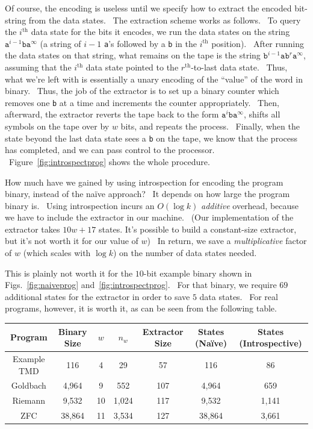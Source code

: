 \documentclass[11pt]{article}
\begin{document}
Of course, the encoding is useless until we specify how to extract the encoded bit-string from the data states. \ The extraction scheme works as follows. \ To query the $i^\textrm{th}$ data state for the bits it encodes, we run the data states on the string $\texttt{a}^{i-1}\texttt{b}\texttt{a}^{\infty}$ (a string of $i-1$ \texttt{a}'s followed by a \texttt{b} in the $i^\textrm{th}$ position). \ After running the data states on that string, what remains on the tape is the string $\texttt{b}^{i-1}\texttt{a}\texttt{b}^r\texttt{a}^{\infty}$, assuming that the $i^\textrm{th}$ data state pointed to the $r^\textrm{th}$-to-last data state. \ Thus, what we're left with is essentially a unary encoding of the ``value'' of the word in binary. \ Thus, the job of the extractor is to set up a binary counter which removes one \texttt{b} at a time and increments the counter appropriately. \ Then, afterward, the extractor reverts the tape back to the form $\texttt{a}^i\texttt{b}\texttt{a}^{\infty}$, shifts all symbols on the tape over by $w$ bits, and repeats the process. \ Finally, when the state beyond the last data state sees a \texttt{b} on the tape, we know that the process has completed, and we can pass control to the processor. \ Figure~\ref{fig:introspectprog} shows the whole procedure.

How much have we gained by using introspection for encoding the program binary, instead of the na\"ive approach? \ It depends on how large the program binary is. \ Using introspection incurs an $O(\log k)$ \emph{additive} overhead, because we have to include the extractor in our machine. \ (Our implementation of the extractor takes $10w + 17$ states. It's possible to build a constant-size extractor, but it's not worth it for our value of $w$) \ In return, we save a \emph{multiplicative} factor of $w$ (which scales with $\log k$) on the number of data states needed.

This is plainly not worth it for the $10$-bit example binary shown in Figs.~\ref{fig:naiveprog} and~\ref{fig:introspectprog}. \ For that binary, we require $69$ additional states for the extractor in order to save $5$ data states. \ For real programs, however, it is worth it, as can be seen from the following table.

\begin{center}
    \begin{tabular}{||c c c c c c c||}
    \hline
    Program & Binary Size & $w$ & $n_w$ & Extractor Size & States (Na\"ive) & States (Introspective) \\ [0.5ex]
    \hline\hline
    Example TMD & 116 & 4 & 29 & 57 & 116 & 86 \\
    \hline
    Goldbach & 4,964 & 9 & 552 & 107 & 4,964 & 659 \\
    \hline
    Riemann & 9,532 & 10 & 1,024 & 117 & 9,532 & 1,141 \\
    \hline
    ZFC & 38,864 & 11 & 3,534 & 127 & 38,864 & 3,661 \\
    \hline
    \end{tabular}
\end{center}
\end{document}
